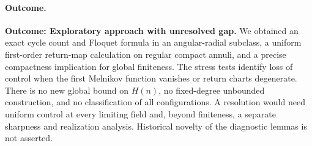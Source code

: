\documentclass[11pt,a4paper]{article}
\numberwithin{equation}{section}
\begin{document}
\paragraph{Outcome.}
\textbf{Outcome: Exploratory approach with unresolved gap.}
We obtained an exact cycle count and Floquet formula in an angular-radial
subclass, a uniform first-order return-map calculation on regular compact
annuli, and a precise compactness implication for global finiteness.
The stress tests identify loss of control when the first Melnikov function
vanishes or return charts degenerate. There is no new global bound on
$H(n)$, no fixed-degree unbounded construction, and no classification of
all configurations. A resolution would need uniform control at every
limiting field and, beyond finiteness, a separate sharpness and realization
analysis. Historical novelty of the diagnostic lemmas is not asserted.
\end{document}
